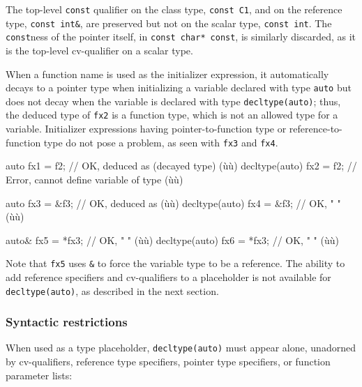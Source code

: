 The top-level \lstinline!const! qualifier on the class type,
\lstinline!const!~\lstinline!C1!, and on the reference type,
\lstinline!const!~\lstinline!int&!, are preserved but not on the scalar type,
\lstinline!const!~\lstinline!int!. The \lstinline!const!ness of the pointer
itself, in \lstinline!const!~\lstinline!char*!~\lstinline!const!, is similarly
discarded, as it is the top-level cv-qualifier on a scalar type.

When a function name is used as the initializer expression, it
automatically decays to a pointer type when initializing a variable
declared with type \lstinline!auto! but does not decay when the variable is
declared with type \lstinline!decltype(auto)!; thus, the deduced type of
\lstinline!fx2! is a function type, which is not an allowed type for a
variable. Initializer expressions having pointer-to-function type or
reference-to-function type do not pose a problem, as seen with
\lstinline!fx3! and \lstinline!fx4!.

\begin{emcppslisting}[emcppsbatch=e2]
auto           fx1 = f2;     // OK, deduced as (decayed type) (ù{}ù)
decltype(auto) fx2 = f2;     // Error, cannot define variable of type (ù{}ù)

auto           fx3 = &f3;    // OK, deduced as (ù{}ù)
decltype(auto) fx4 = &f3;    // OK,    "     " (ù{}ù)

auto&          fx5 = *fx3;   // OK,    "     " (ù{}ù)
decltype(auto) fx6 = *fx3;   // OK,    "     " (ù{}ù)
\end{emcppslisting}
    

Note that \lstinline!fx5! uses \lstinline!&! to force the variable type to be
a reference. The ability to add reference specifiers and cv-qualifiers
to a placeholder is not available for \lstinline!decltype(auto)!, as
described in the next section.

\subsubsection[Syntactic restrictions]{Syntactic restrictions}\label{syntactic-restrictions}

When used as a type placeholder, \lstinline!decltype(auto)! must appear
alone, unadorned by cv-qualifiers, reference type specifiers, pointer
type specifiers, or function parameter lists:

